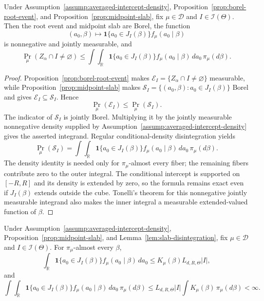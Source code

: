\begin{lemma}
\label{lem:slab-disintegration}
Under Assumption~\ref{assump:averaged-intercept-density},
Proposition~\ref{prop:borel-root-event}, and
Proposition~\ref{prop:midpoint-slab}, fix
$\mu\in\mathcal D$ and $I\in\mathscr I(\Theta)$.  Then the root event
and midpoint slab are Borel, the function
\[
(a_0,\beta)\longmapsto
\mathbf1\{a_0\in J_I(\beta)\}f_\mu(a_0\mid\beta)
\]
is nonnegative and jointly measurable, and
\[
\Pr_\mu(Z_\alpha\cap I\neq\varnothing)
\leq
\int\!\int_{\mathbb R}
\mathbf1\{a_0\in J_I(\beta)\}
f_\mu(a_0\mid\beta)\,da_0\,\pi_\mu(d\beta).
\]
\end{lemma}

\begin{proof}
Proposition~\ref{prop:borel-root-event} makes
$\mathcal E_I=\{Z_\alpha\cap I\neq\varnothing\}$ measurable, while
Proposition~\ref{prop:midpoint-slab} makes
$\mathcal S_I=\{(a_0,\beta):a_0\in J_I(\beta)\}$ Borel and gives
$\mathcal E_I\subseteq\mathcal S_I$.  Hence
\[
\Pr_\mu(\mathcal E_I)\leq\Pr_\mu(\mathcal S_I).
\]
The indicator of $\mathcal S_I$ is jointly Borel.  Multiplying it by the
jointly measurable nonnegative density supplied by
Assumption~\ref{assump:averaged-intercept-density} gives the asserted
integrand.  Regular conditional-density disintegration yields
\[
\Pr_\mu(\mathcal S_I)
=\int\!\int_{\mathbb R}
\mathbf1\{a_0\in J_I(\beta)\}
f_\mu(a_0\mid\beta)\,da_0\,\pi_\mu(d\beta).
\]
The density identity is needed only for $\pi_\mu$-almost every fiber;
the remaining fibers contribute zero to the outer integral.  The
conditional intercept is supported on $[-R,R]$ and its density is
extended by zero, so the formula remains exact even if $J_I(\beta)$
extends outside the cube.  Tonelli's theorem for this nonnegative jointly
measurable integrand also makes the inner integral a measurable
extended-valued function of $\beta$.
\end{proof}

\begin{lemma}
\label{lem:averaged-slice-control}
Under Assumption~\ref{assump:averaged-intercept-density},
Proposition~\ref{prop:midpoint-slab}, and
Lemma~\ref{lem:slab-disintegration}, fix
$\mu\in\mathcal D$ and $I\in\mathscr I(\Theta)$.  For
$\pi_\mu$-almost every $\beta$,
\[
\int_{\mathbb R}
\mathbf1\{a_0\in J_I(\beta)\}
f_\mu(a_0\mid\beta)\,da_0
\leq K_\mu(\beta)L_{d,R,\Theta}|I|,
\]
and
\[
\int\!\int_{\mathbb R}
\mathbf1\{a_0\in J_I(\beta)\}
f_\mu(a_0\mid\beta)\,da_0\,\pi_\mu(d\beta)
\leq L_{d,R,\Theta}|I|
\int K_\mu(\beta)\,\pi_\mu(d\beta)<\infty.
\]
\end{lemma}

